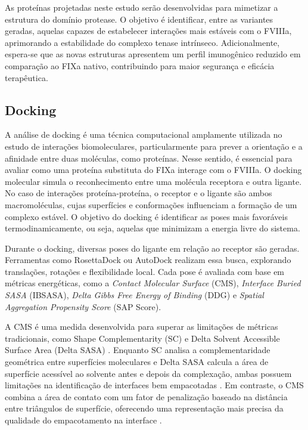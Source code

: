 As proteínas projetadas neste estudo serão desenvolvidas para mimetizar a estrutura do domínio protease.
O objetivo é identificar, entre as variantes geradas, aquelas capazes de estabelecer interações mais estáveis com o FVIIIa,
aprimorando a estabilidade do complexo tenase intrínseco. 
Adicionalmente, espera-se que as novas estruturas apresentem um perfil imunogênico reduzido em comparação ao FIXa nativo, 
contribuindo para maior segurança e eficácia terapêutica.

\subsection{Docking}
\label{subsection:Docking} 
A análise de docking é uma técnica computacional amplamente utilizada no estudo de interações biomoleculares,
particularmente para prever a orientação e a afinidade entre duas moléculas,
como proteínas. Nesse sentido, é essencial para avaliar como uma proteína substituta do FIXa interage com o FVIIIa. 
O docking molecular simula o reconhecimento entre uma molécula receptora e outra ligante. 
No caso de interações proteína-proteína, o receptor e o ligante são ambos macromoléculas,
cujas superfícies e conformações influenciam a formação de um complexo estável.
O objetivo do docking é identificar as poses mais favoráveis termodinamicamente, ou seja, 
aquelas que minimizam a energia livre do sistema.

Durante o docking, diversas poses do ligante em relação ao receptor são geradas.
Ferramentas como RosettaDock ou AutoDock realizam essa busca, explorando translações, rotações e flexibilidade local.
Cada pose é avaliada com base em métricas energéticas, como a \textit{Contact Molecular Surface} (CMS), \textit{Interface Buried SASA} (IBSASA),
\textit{Delta Gibbs Free Energy of Binding} (DDG) e \textit{Spatial Aggregation Propensity Score} (SAP Score).

A CMS é uma medida desenvolvida para superar as limitações de métricas tradicionais, 
como Shape Complementarity (SC) e Delta Solvent Accessible Surface Area (Delta SASA) \cite{Docking}.
Enquanto SC analisa a complementaridade geométrica entre superfícies moleculares e 
Delta SASA calcula a área de superfície acessível ao solvente antes e depois da complexação,
ambas possuem limitações na identificação de interfaces bem empacotadas \cite{Docking}.
Em contraste, o CMS combina a área de contato com um fator de penalização baseado na distância entre triângulos de superfície,
oferecendo uma representação mais precisa da qualidade do empacotamento na interface \cite{Docking}.

